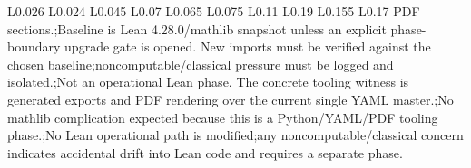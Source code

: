 \begin{longtable}{L{0.026\linewidth} L{0.024\linewidth} L{0.045\linewidth} L{0.07\linewidth} L{0.065\linewidth} L{0.075\linewidth} L{0.11\linewidth} L{0.19\linewidth} L{0.155\linewidth} L{0.17\linewidth}}
PDF sections.;\newline Baseline is Lean 4.28.0/\allowbreak{}mathlib snapshot unless an explicit phase-boundary upgrade gate is opened. New imports must be verified against the chosen baseline;\newline noncomputable/\allowbreak{}classical pressure must be logged and isolated.;\newline Not an operational Lean phase. The concrete tooling witness is generated exports and PDF rendering over the current single YAML master.;\newline No mathlib complication expected because this is a Python/\allowbreak{}YAML/\allowbreak{}PDF tooling phase.;\newline No Lean operational path is modified;\newline any noncomputable/\allowbreak{}classical concern indicates accidental drift into Lean code and requires a separate phase.\\
\hline
\addlinespace[0.24em]

\end{longtable}
